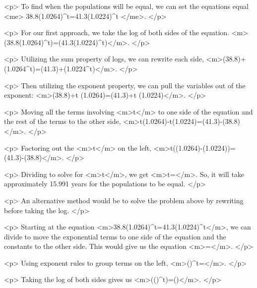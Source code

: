                 <p>
                    To find when the populations will be equal, we can set the equations equal
                    <me>
                        38.8(1.0264)^{t}=41.3(1.0224)^{t}
                    </me>.
                </p>

                <p>
                    For our first approach, we take the log of both sides of the equation.
                    <m>\log(38.8(1.0264)^{t})=\log(41.3(1.0224)^{t})</m>.
                </p>

                <p>
                    Utilizing the sum property of logs, we can rewrite each side, <m>\log(38.8)+\log(1.0264^{t})=\log(41.3)+\log(1.0224^{t})</m>.
                </p>

                <p>
                    Then utilizing the exponent property, we can pull the variables out of the exponent: <m>\log(38.8)+t \log(1.0264)=\log(41.3)+t \log(1.0224)</m>.
                </p>

                <p>
                    Moving all the terms involving <m>t</m> to one side of the equation and the rest of the terms to the other side, <m>t\log(1.0264)-t\log(1.0224)=\log(41.3)-\log(38.8)</m>.
                </p>

                <p>
                    Factoring out the <m>t</m> on the left, <m>t(\log(1.0264)-\log(1.0224))=\log(41.3)-\log(38.8)</m>.
                </p>

                <p>
                    Dividing to solve for <m>t</m>, we get <m>t=</m>.
                    So, it will take approximately 15.991 years for the populations to be equal.
                </p>

                <p>
                    An alternative method would be to solve the problem above by rewriting before taking the log.
                </p>

                <p>
                    Starting at the equation <m>38.8(1.0264)^{t}=41.3(1.0224)^{t}</m>, we can divide to move the exponential terms to one side of the equation and the constants to the other side.
                    This would give us the equation <m>=</m>.
                </p>

                <p>
                    Using exponent rules to group terms on the left, <m>()^{t}=</m>.
                </p>

                <p>
                    Taking the log of both sides gives us <m>\log(()^{t})=\log()</m>.
                </p>

